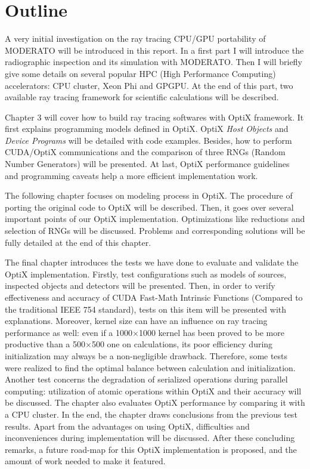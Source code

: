 \section{Outline}
A very initial investigation on the ray tracing CPU/GPU portability of MODERATO will be introduced in this report. In a first part I will introduce the radiographic inspection and its simulation with MODERATO. Then I will briefly give some details on several popular HPC (High Performance Computing) accelerators: CPU cluster, Xeon Phi and GPGPU. At the end of this part, two available ray tracing framework for scientific calculations will be described.

Chapter 3 will cover how to build ray tracing softwares with OptiX framework. It first explains programming models defined in OptiX. OptiX \textit{Host Objects} and \textit{Device Programs} will be detailed with code examples. Besides, how to perform CUDA/OptiX communications and the comparison of three RNGs (Random Number Generators) will be presented. At last, OptiX performance guidelines and programming caveats help a more efficient implementation work.

The following chapter focuses on modeling process in OptiX. The procedure of porting the original code to OptiX will be described. Then, it goes over several important points of our OptiX implementation. Optimizations like reductions and selection of RNGs will be discussed. Problems and corresponding solutions will be fully detailed at the end of this chapter.

The final chapter introduces the tests we have done to evaluate and validate the OptiX implementation. Firstly, test configurations such as models of sources, inspected objects and detectors will be presented. Then, in order to verify effectiveness and accuracy of CUDA Fast-Math Intrinsic Functions (Compared to the traditional IEEE 754 standard), tests on this item will be presented with explanations. Moreover, kernel size can have an influence on ray tracing performance as well: even if a 1000$\times$1000 kernel has been proved to be more productive than a 500$\times$500 one on calculations, its poor efficiency during initialization may always be a non-negligible drawback. Therefore, some tests were realized to find the optimal balance between calculation and initialization. Another test concerns the degradation of serialized operations during parallel computing: utilization of atomic operations within OptiX and their accuracy will be discussed. The chapter also evaluates OptiX performance by comparing it with a CPU cluster. In the end, the chapter draws conclusions from the previous test results. Apart from the advantages on using OptiX, difficulties and inconveniences during implementation will be discussed. After these concluding remarks, a future road-map for this OptiX implementation is proposed, and the amount of work needed to make it featured.
